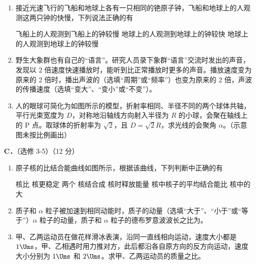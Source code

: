 \documentclass[\gkver]{gaokaozhenti}
\begin{document}
\begin{enumerate}
\begin{enumerate}
	\item
	接近光速飞行的飞船和地球上各有一只相同的铯原子钟，飞船和地球上的人观测这两只钟的快慢，下列说法正确的有

	{飞船上的人观测到飞船上的钟较慢}
	{地球上的人观测到地球上的钟较快}
	{地球上的人观测到地球上的钟较慢}
	\item
	野生大象群也有自己的“语言”。研究人员录下象群“语言”交流时发出的声音，发现以 2 倍速度快速播放时，能听到比正常播放时更多的声音。播放速度变为原来的 2 倍时，播出声波的（选填“周期”或“频率”）也变为原来的 2 倍，声波的传播速度（选填“变大”、“变小”或“不变”）。
	\item
	人的眼球可简化为如图所示的模型，折射率相同、半径不同的两个球体共轴，平行光束宽度为 $D$，对称地沿轴线方向射入半径为 $R$ 的小球，会聚在轴线上的 P 点。取球体的折射率为 $\sqrt 2$，且 $D = \sqrt 2 R$，求光线的会聚角 $\alpha$。（示意图未按比例画出）

\end{enumerate}

\textbf{C．}（选修 3-5）（12 分）

\begin{enumerate}
	\item
	原子核的比结合能曲线如图所示，根据该曲线，下列判断中正确的有


	{ 核比  核更稳定}
	{两个  核结合成  核时释放能量}
	{ 核中核子的平均结合能比  核中的大}
	\item
	质子和 $\alpha$ 粒子被加速到相同动能时，质子的动量（选填“大于”、“小于”或“等于”）$\alpha$ 粒子的动量，质子和 $\alpha$ 粒子的德布罗意波波长之比为。
	\item
	甲、乙两运动员在做花样滑冰表演，沿同一直线相向运动，速度大小都是 $1\Ums$，甲、乙相遇时用力推对方，此后都沿各自原方向的反方向运动，速度大小分别为 $1\Ums$ 和 $2\Ums$。求甲、乙两运动员的质量之比。
\end{enumerate}


\end{enumerate}
\end{document}
